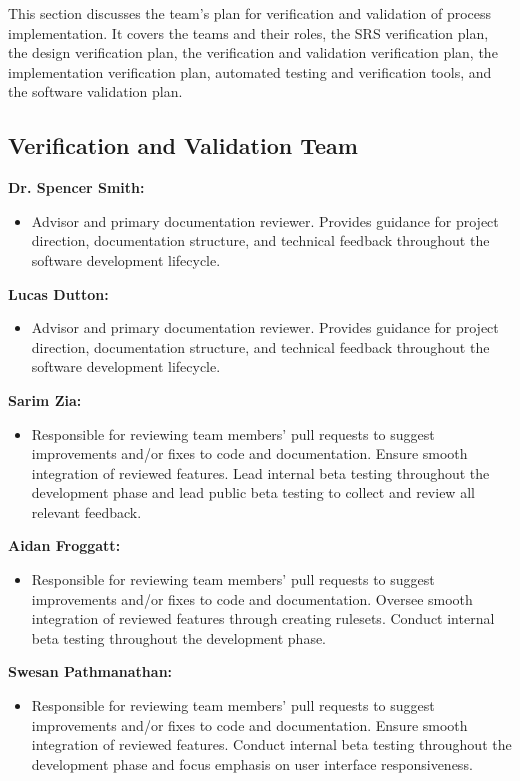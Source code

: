 \documentclass[12pt, titlepage]{article}
\begin{document}
This section discusses the team's plan for verification and validation of process implementation. It covers the teams and their roles, the SRS verification plan, the design verification plan, the verification and validation verification plan, the implementation verification plan, automated testing and verification tools, and the software validation plan. 

\subsection{Verification and Validation Team}

\textbf{Dr. Spencer Smith:}
\begin{itemize}
    \item Advisor and primary documentation reviewer. Provides guidance for project direction, documentation structure, and technical feedback throughout the software development lifecycle.
\end{itemize}

\textbf{Lucas Dutton:}
\begin{itemize}
    \item Advisor and primary documentation reviewer. Provides guidance for project direction, documentation structure, and technical feedback throughout the software development lifecycle.
\end{itemize}

\textbf{Sarim Zia:}
\begin{itemize}
    \item Responsible for reviewing team members’ pull requests to suggest improvements and/or fixes to code and documentation. Ensure smooth integration of reviewed features. Lead internal beta testing throughout the development phase and lead public beta testing to collect and review all relevant feedback.
\end{itemize}

\textbf{Aidan Froggatt:}
\begin{itemize}
    \item Responsible for reviewing team members’ pull requests to suggest improvements and/or fixes to code and documentation. Oversee smooth integration of reviewed features through creating rulesets. Conduct internal beta testing throughout the development phase.
\end{itemize}

\textbf{Swesan Pathmanathan:}
\begin{itemize}
    \item Responsible for reviewing team members’ pull requests to suggest improvements and/or fixes to code and documentation. Ensure smooth integration of reviewed features. Conduct internal beta testing throughout the development phase and focus emphasis on user interface responsiveness.
\end{itemize}
\end{document}
